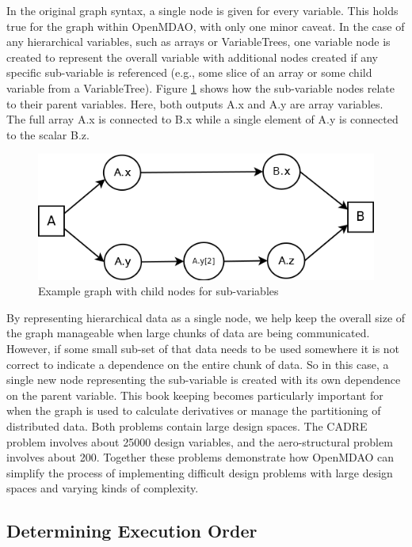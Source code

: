 \documentclass[]{aiaa-tc} %
\begin{document}
    In the original graph syntax, a single node is given for every variable. This holds true for the graph
    within OpenMDAO, with only one minor caveat. In the case of any hierarchical variables, such as arrays
    or VariableTrees, one variable node is created to represent the overall variable with additional nodes
    created if any specific sub-variable is referenced (e.g., some slice of an array or some child variable from a 
    VariableTree). Figure \ref{fig:subvars} shows how the sub-variable nodes relate to their parent variables. Here,
    both outputs A.x and A.y are array variables. The full array A.x is connected to B.x while a single element
    of A.y is connected to the scalar B.z.

     \begin{figure}[!htb]\begin{center}
      \includegraphics[width=.5\textwidth]{images/Graph1}
      \caption{ Example graph with child nodes for sub-variables \label{fig:subvars}}
    \end{center}\end{figure}

    By representing hierarchical data as a single node, we help keep the overall size of the graph manageable
    when large chunks of data are being communicated. However, if some small sub-set of that data needs to be
    used somewhere it is not correct to indicate a dependence on the entire chunk of data. So in this case, a
    single new node representing the sub-variable is created with its own dependence on the parent variable.
    This book keeping becomes particularly important for when the graph is used to calculate derivatives or
    manage the partitioning of distributed data. Both problems contain large design spaces. The CADRE problem 
    involves about 25000 design variables, and the aero-structural problem involves about 200. 
    Together these problems demonstrate how OpenMDAO can simplify the process of implementing difficult 
    design problems with large design spaces and varying kinds of complexity. 


    \subsection{Determining Execution Order}
\end{document}
